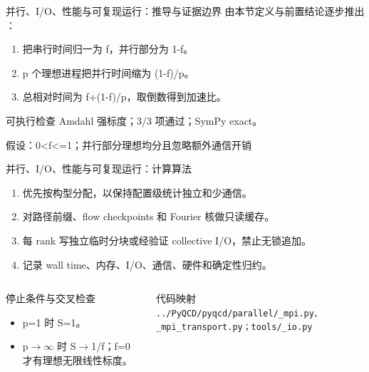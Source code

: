 \begin{frame}[t]{并行、I/\allowbreak{}O、性能与可复现运行：推导与证据边界}
\footnotesize
{}\quad 由本节定义与前置结论逐步推出 ：
\begin{enumerate}
\item 把串行时间归一为 f，并行部分为 1-f。
\item p 个理想进程把并行时间缩为 (1-f)/\allowbreak{}p。
\item 总相对时间为 f+(1-f)/\allowbreak{}p，取倒数得到加速比。
\end{enumerate}\begin{block}{可执行检查}
\quad Amdahl 强标度；3/3 项通过；SymPy exact。
\par\scriptsize 假设：0<f<=1；并行部分理想均分且忽略额外通信开销
\end{block}
\end{frame}

\begin{frame}[t]{并行、I/\allowbreak{}O、性能与可复现运行：计算算法}
\footnotesize
{}\begin{enumerate}
\item 优先按构型分配，以保持配置级统计独立和少通信。
\item 对路径前缀、flow checkpoints 和 Fourier 核做只读缓存。
\item 每 rank 写独立临时分块或经验证 collective I/\allowbreak{}O，禁止无锁追加。
\item 记录 wall time、内存、I/\allowbreak{}O、通信、硬件和确定性归约。
\end{enumerate}\begin{columns}[T,onlytextwidth]
\begin{block}{停止条件与交叉检查}\scriptsize\begin{itemize}
\item[\CheckMark] p=1 时 S=1。
\item[\CheckMark] p\ensuremath{\rightarrow}\ensuremath{\infty} 时 S\ensuremath{\rightarrow}1/\allowbreak{}f；f=0 才有理想无限线性标度。
\end{itemize}\end{block}
\begin{block}{代码映射}
\scriptsize \texttt{.\allowbreak{}.\allowbreak{}/\allowbreak{}PyQCD/\allowbreak{}pyqcd/\allowbreak{}parallel/\allowbreak{}\_\allowbreak{}mpi.\allowbreak{}py、\_\allowbreak{}mpi\_\allowbreak{}transport.\allowbreak{}py；tools/\allowbreak{}\_\allowbreak{}io.\allowbreak{}py}
\end{block}\end{columns}\end{frame}

